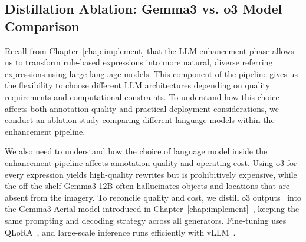 \begin{table}[H]
\centering
\caption{Expression enhancement ablation across four datasets.}
\label{tab:ablation_expression_types}
\end{table}

\subsection{Distillation Ablation: Gemma3 vs. o3 Model Comparison}

Recall from Chapter~\ref{chap:implement} that the LLM enhancement phase allows us to transform rule-based expressions into more natural, diverse referring expressions using large language models. This component of the pipeline gives us the flexibility to choose different LLM architectures depending on quality requirements and computational constraints. To understand how this choice affects both annotation quality and practical deployment considerations, we conduct an ablation study comparing different language models within the enhancement pipeline.

We also need to understand how the choice of language model inside the enhancement pipeline affects annotation quality and operating cost. Using o3 for every expression yields high-quality rewrites but is prohibitively expensive, while the off-the-shelf Gemma3-12B often hallucinates objects and locations that are absent from the imagery. To reconcile quality and cost, we distill o3 outputs~\cite{o3} into the Gemma3-Aerial model introduced in Chapter~\ref{chap:implement}~\cite{gemma3}, keeping the same prompting and decoding strategy across all generators. Fine-tuning uses QLoRA~\cite{qlora}, and large-scale inference runs efficiently with vLLM~\cite{vllm}.

